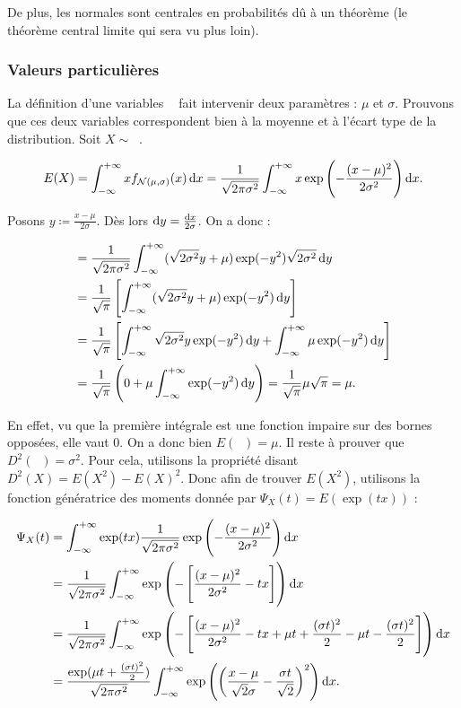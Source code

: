 \documentclass{article}
\DeclareMathOperator{\Nms}{\mathcal N(\mu, \sigma)}
\begin{document}
			De plus, les normales sont centrales en probabilités dû à un théorème (le théorème central limite qui sera vu plus loin).

		\subsubsection{Valeurs particulières}
			La définition d'une variables $\Nms$ fait intervenir deux paramètres : $\mu$ et $\sigma$. Prouvons que ces deux variables correspondent bien à la moyenne et à l'écart type
			de la distribution. Soit $X \sim \Nms$.

			\[E(X) = \int_{-\infty}^{+\infty}xf_{\Nms}(x)\dif x = \frac 1{\sqrt {2\pi\sigma^2}}\int_{-\infty}^{+\infty}x\exp\left(-\frac {(x-\mu)^2}{2\sigma^2}\right)\dif x.\]

			Posons $y \coloneqq\frac {x-\mu}{2\sigma}$. Dès lors $\dif y = \frac {\dif x}{2\sigma}$. On a donc :

			\[\begin{aligned}
				&= \frac 1{\sqrt {2\pi\sigma^2}}\int_{-\infty}^{+\infty}(\sqrt {2\sigma^2}y + \mu)\exp(-y^2)\sqrt {2\sigma^2}\dif y \\
				&= \frac 1{\sqrt \pi}\left[\int_{-\infty}^{+\infty}(\sqrt {2\sigma^2}y + \mu)\exp(-y^2)\dif y\right] \\
				&= \frac 1{\sqrt \pi}\left[\int_{-\infty}^{+\infty}\sqrt {2\sigma^2}y\exp(-y^2)\dif y + \int_{-\infty}^{+\infty}\mu\exp(-y^2)\dif y\right] \\
				&= \frac 1{\sqrt{\pi}}\left(0 + \mu\int_{-\infty}^{+\infty}\exp(-y^2)\dif y\right) = \frac 1{\sqrt \pi}\mu\sqrt {\pi} = \mu.
			\end{aligned}\]

			En effet, vu que la première intégrale est une fonction impaire sur des bornes opposées, elle vaut 0. On a donc bien $E(\Nms) = \mu$. Il reste à prouver que $D^2(\Nms) = \sigma^2$.
			Pour cela, utilisons la propriété disant $D^2(X) = E(X^2) - E(X)^2$. Donc afin de trouver $E(X^2)$, utilisons la fonction génératrice des moments donnée par $\Psi_X(t) = E(\exp(tx))$ :

			\begin{align*}
				\Psi_X(t) &= \int_{-\infty}^{+\infty}\exp(tx)\frac 1{\sqrt {2\pi\sigma^2}}\exp\left(-\frac {(x-\mu)^2}{2\sigma^2}\right)\dif x \\
			              &= \frac 1{\sqrt {2\pi\sigma^2}}\int_{-\infty}^{+\infty}\exp\left(-\left[\frac {(x-\mu)^2}{2\sigma^2} - tx\right]\right)\dif x \\
						  &= \frac 1{\sqrt {2\pi\sigma^2}}\int_{-\infty}^{+\infty}\exp\left(-\left[\frac {(x-\mu)^2}{2\sigma^2} - tx + \mu t + \frac {(\sigma t)^2}2 - \mu t - \frac {(\sigma t)^2}2\right]\right)\dif x \\
						  &= \frac {\exp(\mu t + \frac {(\sigma t)^2}2)}{\sqrt {2\pi\sigma^2}}\int_{-\infty}^{+\infty}\exp\left(\left(\frac {x-\mu}{\sqrt 2\sigma} - \frac {\sigma t}{\sqrt 2}\right)^2\right)\dif x.
			\end{align*}
\end{document}
